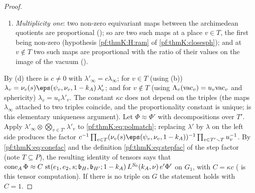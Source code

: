 \begin{proof}
\begin{enumerate}[label=(\alph*)]
uniqueness and the spherical statements) together with an injectivity statement for the smaller configuration; equivariance
comes from the constant-term formulas \ref{pf:thmK:L:ctsz}, \ref{pf:thmK:L:ctbc} and the invariance of the components of the
constant terms (). The maps are non-zero by $\mathcal B(p+q)$ (the theta
integrals of $G_1$ do not vanish identically) and by bump functions at the archimedean place
().
\item \emph{Multiplicity one}: two non-zero equivariant maps between the archimedean quotients are proportional
(); so are two such maps at a place
$v\in T$, the first being non-zero (hypothesis \ref{pf:thmK:H:ram} of \cref{pf:thmK:closesph}); and at $v\notin T$ two such
maps are proportional with the ratio of their values on the image of the vacuum
().
\end{enumerate}
By (d) there is $c\ne0$ with $\lambda'_\infty=c\lambda_\infty$; for $v\in T$ (using (b)) $\lambda_v=\nu_v(s)\eps(\psi_v,\nu_v,
1-k_A)\,\lambda'_v$; and for $v\notin T$ (using $\Lambda_v(\mathrm{vac}_v)=u_v\mathrm{vac}_v$ and sphericity) $\lambda_v=u_v\lambda'_v$.
The constant $\kappa c$ does not depend on the triples (the maps $\lambda_\infty$ attached to two triples coincide, and the
proportionality constant is unique;  is this elementary uniqueness argument).
Let $\Phi\approx\Phi'$ with decompositions over $T'$. Apply $\lambda'_\infty\otimes\bigotimes_{v\in T'}\lambda'_v$ to
\eqref{pf:thmK:eq:polmatch}; replacing $\lambda'$ by $\lambda$ on the left side produces the factor
$c^{-1}\prod_{v\in T}(\nu_v(s)\eps(\psi_v,\nu_v,1-k_A))^{-1}\prod_{v\in T'\smallsetminus T}u_v^{-1}$. By
\eqref{pf:thmK:eq:conefac} and the definition \eqref{pf:thmK:eq:stepfac} of the step factor (note $T\subseteq P$), the
resulting identity of tensors says that $\operatorname{cone}_A\Phi\approx C\,\operatorname{st}(e_1,e_2,s;\mathfrak b_H,\mathfrak b_{H'};1-k_A)\,
L^{S_0}(k_A,\nu)\,e'\Phi'$ on $G_1$, with $C=\kappa c$ ( is this tensor
computation). If there is no triple on $G$ the statement holds with $C=1$.
\end{proof}

